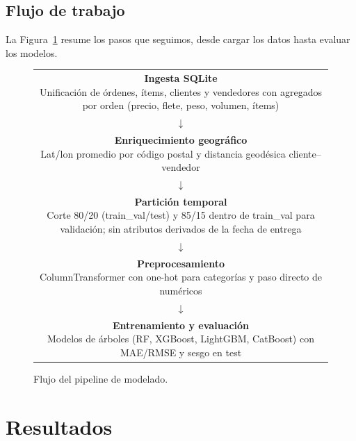 \documentclass[journal]{IEEEtran}
\begin{document}
\subsection{Flujo de trabajo}

La Figura~\ref{fig:pipeline} resume los pasos que seguimos, desde cargar los datos hasta evaluar los modelos.

\begin{figure}[H]
	\centering
	\setlength{\fboxsep}{6pt}
	\begin{tabular}{c}
		\fbox{\parbox{0.9\linewidth}{\textbf{Ingesta SQLite}             \\ Unificación de órdenes, ítems, clientes y vendedores con agregados por orden (precio, flete, peso, volumen, ítems)}}\\[8pt]
		$\downarrow$                                                     \\[8pt]
		\fbox{\parbox{0.9\linewidth}{\textbf{Enriquecimiento geográfico} \\ Lat/lon promedio por código postal y distancia geodésica cliente--vendedor}}\\[8pt]
		$\downarrow$                                                     \\[8pt]
		\fbox{\parbox{0.9\linewidth}{\textbf{Partición temporal}         \\ Corte 80/20 (train\_val/test) y 85/15 dentro de train\_val para validación; sin atributos derivados de la fecha de entrega}}\\[8pt]
		$\downarrow$                                                     \\[8pt]
		\fbox{\parbox{0.9\linewidth}{\textbf{Preprocesamiento}           \\ ColumnTransformer con one-hot para categorías y paso directo de numéricos}}\\[8pt]
		$\downarrow$                                                     \\[8pt]
		\fbox{\parbox{0.9\linewidth}{\textbf{Entrenamiento y evaluación} \\ Modelos de árboles (RF, XGBoost, LightGBM, CatBoost) con MAE/RMSE y sesgo en test}}\\
	\end{tabular}
	\caption{Flujo del pipeline de modelado.}
	\label{fig:pipeline}
\end{figure}

\section{Resultados}
\end{document}
